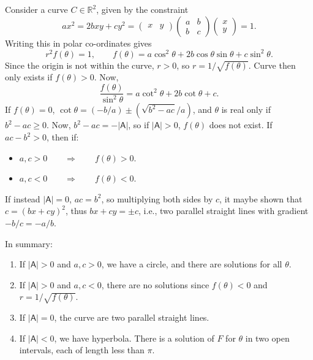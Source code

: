 \documentclass[10pt,notitlepage]{revtex4-1}
\begin{document}
Consider a curve $C\in\mathbb{R}^2$, given by the constraint
\begin{equation}
	ax^2=2bxy+cy^2 = \begin{pmatrix}x & y\end{pmatrix}
	\begin{pmatrix}a & b\\ b & c\end{pmatrix}
	\begin{pmatrix}x\\ y\end{pmatrix}=1.
\end{equation}
Writing this in polar co-ordinates gives
\begin{equation}
	r^2 f(\theta)=1,\qquad f(\theta)=a\cos^2\theta + 2b\cos\theta\sin\theta
	+ c\sin^2\theta.
\end{equation}
Since the origin is not within the curve, $r>0$, so $r=1/\sqrt{f(\theta)}$.
Curve then only exists if $f(\theta)>0$. Now,
\begin{equation}
	\frac{f(\theta)}{\sin^2 \theta}=a\cot^2 \theta + 2b\cot\theta + c.
\end{equation}
If $f(\theta)=0$, $\cot\theta=(-b/a)\pm(\sqrt{b^2-ac}/a)$, and $\theta$ is real
only if $b^2-ac\geq0$. Now, $b^2-ac=-|\mathsf{A}|$, so if $|\mathsf{A}|>0$,
$f(\theta)$ does not exist. If $ac-b^2>0$, then if:
\begin{itemize}
	\item $a,c>0\qquad\Rightarrow\qquad f(\theta)>0$.
	\item $a,c<0\qquad\Rightarrow\qquad f(\theta)<0$.
\end{itemize}
If instead $|\mathsf{A}|=0$, $ac=b^2$, so multiplying both sides by $c$, it
maybe shown that $c=(bx+cy)^2$, thus $bx+cy=\pm c$, i.e., two parallel straight
lines with gradient $-b/c=-a/b$.

In summary:
\begin{enumerate}
	\item If $|\mathsf{A}|>0$ and $a,c>0$, we have a circle, and there are
	solutions for all $\theta$.
	\item If $|\mathsf{A}|>0$ and $a,c<0$, there are no solutions since
	$f(\theta)<0$ and $r=1/\sqrt{f(\theta)}$.
	\item If $|\mathsf{A}|=0$, the curve are two parallel straight lines.
	\item If $|\mathsf{A}|<0$, we have hyperbola. There is a solution of $F$ for
	$\theta$ in two open intervals, each of length less than $\pi$.
\end{enumerate}
\end{document}
